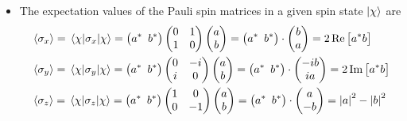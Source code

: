 \documentclass[11pt, a4paper]{article}
\begin{document}
\begin{itemize}
	\item The expectation values of the Pauli spin matrices in a given spin state $ \ket{\chi} $ are
	\begin{align*}
		& \ev{\sigma_{x}} = \mel{\chi}{\sigma_{x}}{\chi} = \big(a^{*} \, \ b^{*}\big) 
		\begin{pmatrix}
			0 & 1\\
			1 & 0
		\end{pmatrix}
		\begin{pmatrix}
			a\\
			b
		\end{pmatrix}
			= \big(a^{*} \, \ b^{*}\big)\cdot 
		\begin{pmatrix}
			b\\
			a
		\end{pmatrix}
		= 2 \Re \big[a^{*}b\big]\\
		& \ev{\sigma_{y}} = \mel{\chi}{\sigma_{y}}{\chi} = \big(a^{*} \, \ b^{*}\big) 
		\begin{pmatrix}
			0 & -i\\
			i & 0
		\end{pmatrix}
		\begin{pmatrix}
			a\\
			b
		\end{pmatrix}
			= \big(a^{*} \, \ b^{*}\big)\cdot 
		\begin{pmatrix}
			-ib\\
			ia
		\end{pmatrix}
		= 2 \Im \big[a^{*}b\big]\\
		& \ev{\sigma_{z}} = \mel{\chi}{\sigma_{z}}{\chi} = \big(a^{*} \, \ b^{*}\big) 
		\begin{pmatrix}
			1 & 0\\
			0 & -1
		\end{pmatrix}
		\begin{pmatrix}
			a\\
			b
		\end{pmatrix}
			= \big(a^{*} \, \ b^{*}\big)\cdot 
		\begin{pmatrix}
			a\\
			-b
		\end{pmatrix}
		= \abs{a}^{2} - \abs{b}^{2}
	\end{align*}
	

\end{itemize}
\end{document}
